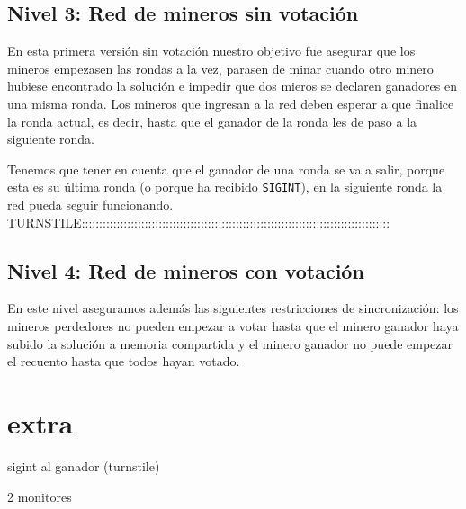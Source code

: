 \documentclass{article}
\begin{document}
\subsection*{Nivel 3: Red de mineros sin votación}

En esta primera versión sin votación nuestro objetivo fue asegurar que los mineros empezasen las rondas a la vez, parasen de minar cuando otro minero hubiese encontrado la solución e impedir que dos mieros se declaren ganadores en una misma ronda. Los mineros que ingresan a la red deben esperar a que finalice la ronda actual, es decir, hasta que el ganador de la ronda les de paso a la siguiente ronda.

Tenemos que tener en cuenta que el ganador de una ronda se va a salir, porque esta es su última ronda (o porque ha recibido \texttt{SIGINT}), en la siguiente ronda la red pueda seguir funcionando. 
TURNSTILE:::::::::::::::::::::::::::::::::::::::::::::::::::::::::::::::::::::::::::::::::::::::: 


\subsection*{Nivel 4: Red de mineros con votación}

En este nivel aseguramos además las siguientes restricciones de sincronización: los mineros perdedores no pueden empezar a votar hasta que el minero ganador haya subido la solución a memoria compartida y el minero ganador no puede empezar el recuento hasta que todos hayan votado.


\section*{extra}
sigint al ganador (turnstile)

2 monitores
\end{document}
